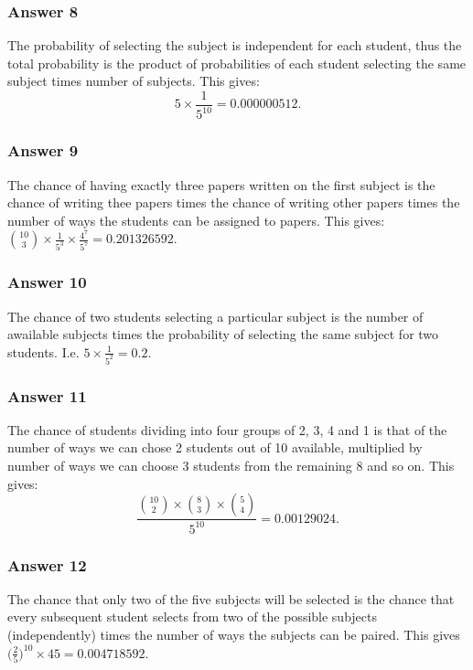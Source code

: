 \documentclass[11pt]{article}
\begin{document}
\subsubsection{Answer 8}
\label{sec-1-3-1}
The probability of selecting the subject is independent for each student,
thus the total probability is the product of probabilities of each student
selecting the same subject times number of subjects.  This gives:
\begin{equation*}
  5 \times \frac{1}{5^{10}} = \num{0.000000512}.
\end{equation*}
\subsubsection{Answer 9}
\label{sec-1-3-2}
The chance of having exactly three papers written on the first subject is
the chance of writing thee papers times the chance of writing other papers
times the number of ways the students can be assigned to papers.  This
gives:
$\binom{10}{3} \times \frac{1}{5^3} \times \frac{4^7}{5^7} = \num{0.201326592}$.
\subsubsection{Answer 10}
\label{sec-1-3-3}
The chance of two students selecting a particular subject is the number of
awailable subjects times the probability of selecting the same subject for
two students.  I.e. $5 \times \frac{1}{5^2} = 0.2$.
\subsubsection{Answer 11}
\label{sec-1-3-4}
The chance of students dividing into four groups of 2, 3, 4 and 1 is that
of the number of ways we can chose 2 students out of 10 available, multiplied
by number of ways we can choose 3 students from the remaining 8 and so on.
This gives:
\begin{equation*}
  \frac{\binom{10}{2} \times \binom{8}{3} \times \binom{5}{4}}{5^{10}} =
  \num{0.00129024}.
\end{equation*}
\subsubsection{Answer 12}
\label{sec-1-3-5}
The chance that only two of the five subjects will be selected is the chance
that every subsequent student selects from two of the possible subjects
(independently) times the number of ways the subjects can be paired.  This
gives $\Big(\frac{2}{5}\Big)^{10} \times 45 = \num{0.004718592}$.
\end{document}
